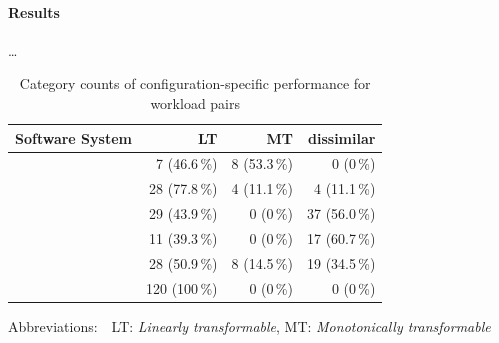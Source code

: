 \paragraph*{Results}
\ldots

\begin{table}
	\footnotesize
	\caption{Category counts of configuration-specific performance for workload pairs}
	\begin{tabular}{p{2.4cm}rrr}
		\toprule
		\textbf{Software System} & \textbf{LT} & \textbf{MT} & \textbf{dissimilar}\\
		\midrule
		\jumper &  7 (46.6\,\%) & \cellcolor{nicegreen!20}8 (53.3\,\%)& 0 (0\,\%)\\
		\kanzi &  \cellcolor{nicegreen!20}28 (77.8\,\%)& 4 (11.1\,\%) & 4 (11.1\,\%)\\
		\dconvert &  29 (43.9\,\%) & 0 (0\,\%) & \cellcolor{nicegreen!20}37 (56.0\,\%)\\
		\htwo &  11 (39.3\,\%) & 0 (0\,\%) & \cellcolor{nicegreen!20}17 (60.7\,\%)\\
		\batik &  \cellcolor{nicegreen!20}28 (50.9\,\%) & 8 (14.5\,\%) & 19 (34.5\,\%)\\
		\jadx  &  \cellcolor{nicegreen!20}120 (100\,\%) & 0 (0\,\%) & 0 (0\,\%)\\
		\bottomrule
	\end{tabular}
	\label{tab:categorization}
	
	{\vspace{2mm}
		{\footnotesize Abbreviations:$\quad$LT: \textit{Linearly transformable}, MT: \textit{Monotonically transformable}}
	\vspace{0.1cm}}
	
\end{table}

